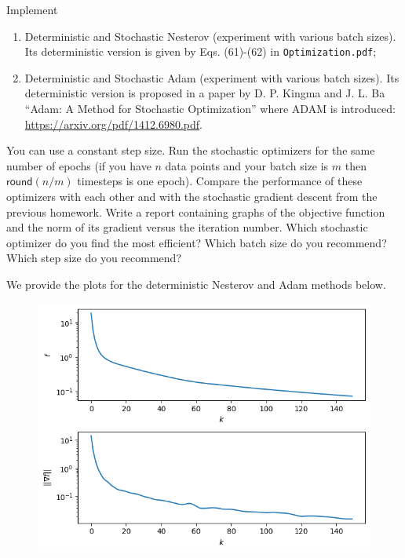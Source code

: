 \documentclass{../kin_math}
\begin{document}
\begin{questions}
  Implement
  \begin{enumerate}
    \item Deterministic and Stochastic Nesterov (experiment with various batch sizes). Its deterministic version is given by Eqs. (61)-(62) in \texttt{Optimization.pdf};
    \item Deterministic and Stochastic Adam (experiment with various batch sizes). Its deterministic version is proposed in a paper by D. P. Kingma and J. L. Ba ``Adam: A Method for Stochastic Optimization'' where ADAM is introduced: \url{https://arxiv.org/pdf/1412.6980.pdf}.
  \end{enumerate}
  You can use a constant step size. Run the stochastic optimizers for the same number of epochs (if you have $n$ data points and your batch size is $m$ then $\textsf{round}(n / m)$ timesteps is one epoch). Compare the performance of these optimizers with each other and with the stochastic gradient descent from the previous homework. Write a report containing graphs of the objective function and the norm of its gradient versus the iteration number. Which stochastic optimizer do you find the most efficient? Which batch size do you recommend? Which step size do you recommend?
  \begin{solution}
    We provide the plots for the deterministic Nesterov and Adam methods below.
    \begin{figure}
      \centering
      \includegraphics[scale=0.8]{det_nest.png}
    \end{figure}
    \begin{figure}
      \centering

\end{figure}
\end{solution}
\end{questions}
\end{document}
